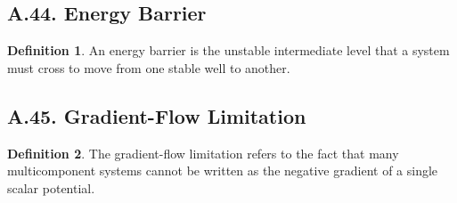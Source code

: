 \documentclass[11pt]{article}
\theoremstyle{definition}
\newtheorem{definition}{Definition}
\theoremstyle{remark}
\begin{document}
\subsection*{A.44. Energy Barrier}
\begin{definition}
An energy barrier is the unstable intermediate level that a system must cross to move from one stable well to another.
\end{definition}

\subsection*{A.45. Gradient-Flow Limitation}
\begin{definition}
The gradient-flow limitation refers to the fact that many multicomponent systems cannot be written as the negative gradient of a single scalar potential.
\end{definition}
\end{document}
